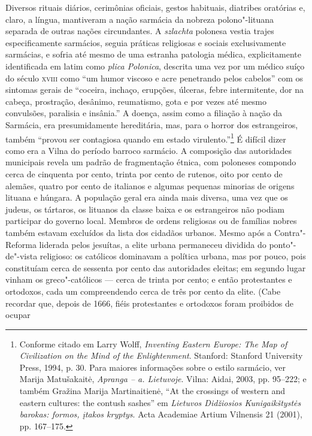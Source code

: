 Diversos rituais diários, cerimônias oficiais, gestos habituais,
diatribes oratórias e, claro, a língua, mantiveram a nação sarmácia da
nobreza polono"-lituana separada de outras nações circundantes. A
\textit{szlachta} polonesa vestia trajes especificamente sarmácios, seguia
práticas religiosas e sociais exclusivamente sarmácias, e sofria até
mesmo de uma estranha patologia médica, explicitamente identificada em
latim como \textit{plica Polonica}, descrita uma vez por um médico suíço
do século \textsc{xviii} como ``um humor viscoso e acre penetrando pelos cabelos''
com os sintomas gerais de ``coceira, inchaço, erupções, úlceras, febre
intermitente, dor na cabeça, prostração, desânimo, reumatismo, gota e
por vezes até mesmo convulsões, paralisia e insânia.'' A doença, assim
como a filiação à nação da Sarmácia, era presumidamente hereditária,
mas, para o horror dos estrangeiros, também ``provou ser contagiosa
quando em estado virulento.''\footnote{Conforme citado em Larry Wolff, \textit{Inventing Eastern Europe: The Map of Civilization on the Mind of the Enlightenment}. Stanford: Stanford University Press, 1994, p. 30. Para maiores informações sobre o estilo sarmácio, ver Marija Matušakaitė, \textit{Apranga -- a. Lietuvoje}. Vilna: Aidai, 2003, pp. 95--222; e também Gražina Marija Martinaitienė, ``At the crossings of western and eastern cultures: the contush sashes'' em \textit{Lietuvos Didžiosios Kunigaikštystės barokas: formos, įtakos kryptys}. Acta Academiae Artium Vilnensis 21 (2001), pp. 167--175.}
É difícil dizer como era a Vilna do período barroco sarmácio. A
composição das autoridades municipais revela um padrão de fragmentação
étnica, com poloneses compondo cerca de cinquenta por cento, trinta por
cento de rutenos, oito por cento de alemães, quatro por cento de
italianos e algumas pequenas minorias de origens lituana e húngara. A
população geral era ainda mais diversa, uma vez que os judeus, os
tártaros, os lituanos da classe baixa e os estrangeiros não podiam
participar do governo local. Membros de ordens religiosas ou de famílias
nobres também estavam excluídos da lista dos cidadãos urbanos. Mesmo
após a Contra"-Reforma liderada pelos jesuítas, a elite urbana permaneceu
dividida do ponto"-de"-vista religioso: os católicos dominavam a política
urbana, mas por pouco, pois constituíam cerca de sessenta por cento das
autoridades eleitas; em segundo lugar vinham os greco"-católicos --- cerca
de trinta por cento; e então protestantes e ortodoxos, cada um
compreendendo cerca de três por cento da elite. (Cabe recordar que,
depois de 1666, fiéis protestantes e ortodoxos foram proibidos de ocupar
